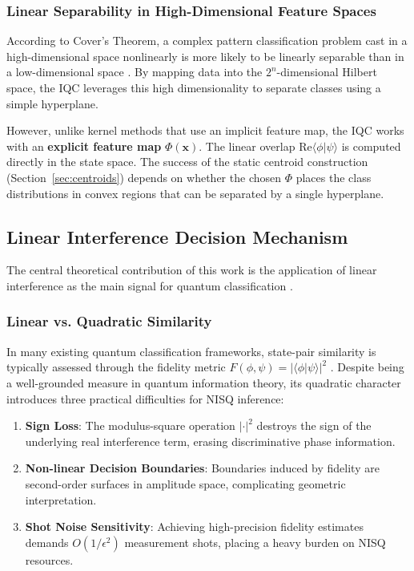 \documentclass[conference]{IEEEtran}
\begin{document}
\subsubsection{Linear Separability in High-Dimensional Feature Spaces}
According to Cover's Theorem, a complex pattern classification problem cast in a high-dimensional space nonlinearly is more likely to be linearly separable than in a low-dimensional space \cite{cover1965geometrical}. By mapping data into the $2^n$-dimensional Hilbert space, the IQC leverages this high dimensionality to separate classes using a simple hyperplane.

However, unlike kernel methods that use an implicit feature map, the IQC works with an \textbf{explicit feature map} $\Phi(\mathbf{x})$. The linear overlap $\mathrm{Re}\langle \phi | \psi \rangle$ is computed directly in the state space. The success of the static centroid construction (Section~\ref{sec:centroids}) depends on whether the chosen $\Phi$ places the class distributions in convex regions that can be separated by a single hyperplane.

\subsection{Linear Interference Decision Mechanism}
The central theoretical contribution of this work is the application of linear interference as the main signal for quantum classification \cite{schuld2017distance,schuld2018book}.

\subsubsection{Linear vs. Quadratic Similarity}
In many existing quantum classification frameworks, state-pair similarity is typically assessed through the fidelity metric $F(\phi, \psi) = |\langle \phi | \psi \rangle|^2$ \cite{nielsen2000qcqi}. Despite being a well-grounded measure in quantum information theory, its quadratic character introduces three practical difficulties for NISQ inference:
\begin{enumerate}
    \item \textbf{Sign Loss}: The modulus-square operation $|\cdot|^2$ destroys the sign of the underlying real interference term, erasing discriminative phase information.
    \item \textbf{Non-linear Decision Boundaries}: Boundaries induced by fidelity are second-order surfaces in amplitude space, complicating geometric interpretation.
    \item \textbf{Shot Noise Sensitivity}: Achieving high-precision fidelity estimates demands $O(1/\epsilon^2)$ measurement shots, placing a heavy burden on NISQ resources.
\end{enumerate}
\end{document}
